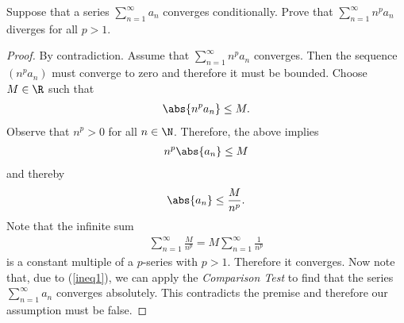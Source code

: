 \documentclass{article}
\begin{document}
\begin{claim}
   Suppose that a series $\sum_{n=1}^\infty a_n$ converges conditionally. Prove
   that $\sum_{n=1}^\infty n^pa_n$ diverges for all $p> 1$.
\end{claim}
\begin{proof}
   By contradiction. Assume that $\sum_{n=1}^\infty n^pa_n$ converges. Then the sequence $(n^pa_n)$
   must converge to zero and therefore it must be bounded. Choose $M\in\R$ such 
   that
   \begin{align*}
      \abs{n^pa_n}\leq M.
   \end{align*}
   Observe that $n^p > 0$ for all $n\in\N$. Therefore, the above implies 
   \begin{align*}
      n^p\abs{a_n} \leq M
   \end{align*}
   and thereby
   \begin{align}
      \label{ineq1}
      \abs{a_n} \leq \frac{M}{n^p} .
   \end{align}
   Note that the infinite sum
   \begin{align*}
      \sum_{n=1}^\infty \frac{M}{n^p} = M\sum_{n=1}^\infty \frac{1}{n^p}
   \end{align*}
   is a constant multiple of a $p$-series with $p>1$. Therefore it converges.
   Now note that, due to (\ref{ineq1}), we can apply the \emph{Comparison Test}
   to find that the series $\sum_{n=1}^\infty a_n$ converges absolutely.
   This contradicts the premise and therefore our assumption must be false.
\end{proof}
\end{document}
